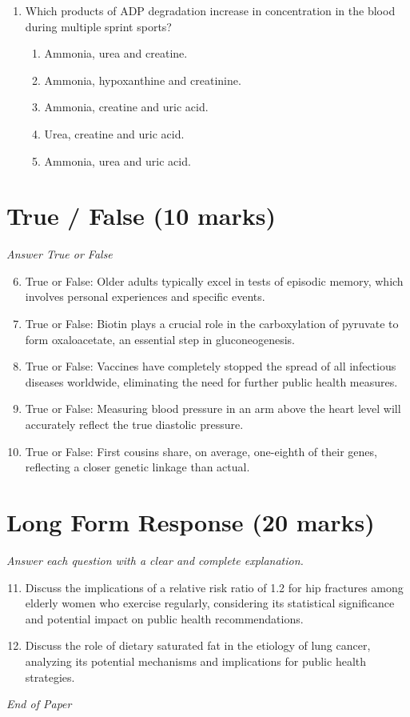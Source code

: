 \documentclass[12pt]{article}
\begin{document}
\begin{enumerate}[label=\arabic*.]
\begin{enumerate}[label=(\alph*)]
    \item Deep pyro sequencing (NGS)
    \item Monoclonal antibody techniques
\end{enumerate}
\item Which products of ADP degradation increase in concentration in the blood during multiple sprint sports?
\begin{enumerate}[label=(\alph*)]
    \item Ammonia, urea and creatine.
    \item Ammonia, hypoxanthine and creatinine.
    \item Ammonia, creatine and uric acid.
    \item Urea, creatine and uric acid.
    \item Ammonia, urea and uric acid.
\end{enumerate}
\end{enumerate}

\section*{True / False (10 marks)}
\textit{Answer True or False}
\begin{enumerate}[label=\arabic*.]
\setcounter{enumi}{5}
\item True or False: Older adults typically excel in tests of episodic memory, which involves personal experiences and specific events.
\item True or False: Biotin plays a crucial role in the carboxylation of pyruvate to form oxaloacetate, an essential step in gluconeogenesis.
\item True or False: Vaccines have completely stopped the spread of all infectious diseases worldwide, eliminating the need for further public health measures.
\item True or False: Measuring blood pressure in an arm above the heart level will accurately reflect the true diastolic pressure.
\item True or False: First cousins share, on average, one-eighth of their genes, reflecting a closer genetic linkage than actual.
\end{enumerate}

\section*{Long Form Response (20 marks)}
\textit{Answer each question with a clear and complete explanation.}
\begin{enumerate}[label=\arabic*.]
\setcounter{enumi}{10}
\item Discuss the implications of a relative risk ratio of 1.2 for hip fractures among elderly women who exercise regularly, considering its statistical significance and potential impact on public health recommendations.
\item Discuss the role of dietary saturated fat in the etiology of lung cancer, analyzing its potential mechanisms and implications for public health strategies.
\end{enumerate}

\vfill
\noindent\textit{End of Paper}
\end{document}
